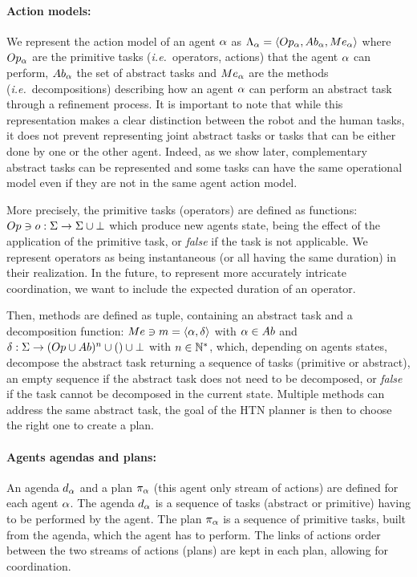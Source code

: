 \documentclass[a4paper,11pt,twoside]{StyleThese}
\begin{document}
\paragraph{\bf Action models:}
We represent the action model of an agent $\alpha$ as $\Lambda_{\alpha} = \langle Op_{\alpha}, Ab_{\alpha}, Me_{\alpha} \rangle$ where $Op_{\alpha}$ are the primitive tasks (\textit{i.e.}~operators, actions) that the agent $\alpha$ can perform, $Ab_{\alpha}$ the set of abstract tasks and $Me_{\alpha}$ are the methods (\textit{i.e.}~decompositions) describing how an agent $\alpha$ can perform an abstract task through a refinement process. It is important to note that while this representation makes a clear distinction between the robot and the human tasks, it does not prevent representing joint abstract tasks or tasks that can be either done by one or the other agent. Indeed, as we show later, complementary abstract tasks can be represented and some tasks can have the same operational model even if they are not in the same agent action model. 

More precisely, the primitive tasks (operators) are defined as functions: $Op \ni o: \Sigma \rightarrow \Sigma \cup \bot$ which produce new agents state, being the effect of the application of the primitive task, or \textit{false} if the task is not applicable. We represent operators as being instantaneous (or all having the same duration) in their realization. In the future, to represent more accurately intricate coordination, we want to include the expected duration of an operator.

Then, methods are defined as tuple, containing an abstract task and a decomposition function: $Me \ni m = \langle \alpha, \delta \rangle$ with $\alpha \in Ab$ and $\delta: \Sigma \rightarrow (Op \cup Ab)^n \cup () \cup \bot$ with $n \in \mathbb{N}^*$, which, depending on agents states, decompose the abstract task returning a sequence of tasks (primitive or abstract), an empty sequence if the abstract task does not need to be decomposed, or \textit{false} if the task cannot be decomposed in the current state. Multiple methods can address the same abstract task, the goal of the HTN planner is then to choose the right one to create a plan.

\paragraph{\bf Agents agendas and plans:}
An agenda $d_{\alpha}$ and a plan $\pi_{\alpha}$ (this agent only stream of actions) are defined for each agent $\alpha$. The agenda $d_{\alpha}$ is a sequence of tasks (abstract or primitive) having to be performed by the agent. The plan $\pi_{\alpha}$ is a sequence of primitive tasks, built from the agenda, which the agent has to perform. The links of actions order between the two streams of actions (plans) are kept in each plan, allowing for coordination.
\end{document}
